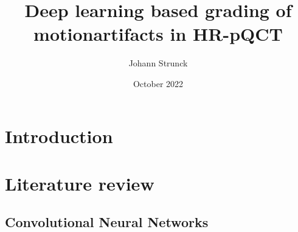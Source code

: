 \documentclass[acmsmall, review]{acmart}
\title{Deep learning based grading of motionartifacts in HR-pQCT}
\date{October 2022}
\author{Johann Strunck}
\begin{document}
\begin{abstract}

\end{abstract}
	\maketitle

\section{Introduction}
	
	
\section{Literature review}
\subsection{Convolutional Neural Networks}
\end{document}

